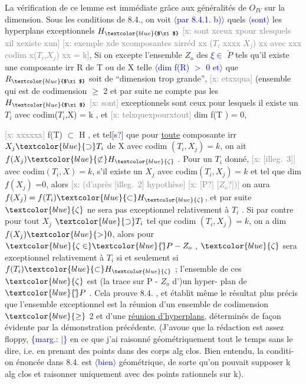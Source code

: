 \documentclass[11pt]{article}
\newcommand{\scanpage}[1]{\par\bigskip\noindent{\small\sffamily[scan #1]}\par}
\newcommand{\mspage}[1]{{\small\sffamily[p.\,#1]}}
\newcommand{\hand}[1]{\textcolor{blue}{#1}}
\let\over\relax
\newcommand{\over}[2]{\textcolor{gray}{#1}\textcolor{blue}{\ensuremath{^{\!\nearrow}}#2}}
\newcommand{\inserted}[2][]{\textcolor{blue}{$\langle$#2$\rangle$}}
\newcommand{\margin}[1]{\textcolor{blue}{\{\textsf{marg.:} #1\}}}
\newcommand{\xout}[1]{\textcolor{gray}{[\textsf{x:} #1]}}
\newcommand{\uline}[1]{\underline{#1}}
\newcommand{\unsure}[1]{[#1?]}
\newcommand{\illegible}[1]{[\textsf{illeg.\ #1}]}
\begin{document}
La vérification de ce lemme est immédiate grâce aux généralités
de $O_{IV}$ sur la dimension. Sous les conditions de 8.4., on voit \inserted[typed]{par 8.4.1. b)} quels \inserted[typed]{sont}
les hyperplans exceptionnels $H_{\hand{$\xi$}}$ \xout{sont xceux xpour xlesquels xil xexiste xun}
\xout{exemple xde xcomposantes xirréd xx ($T_i$ xxxx $X_j$) xx avec xxx codim x($T_i$,$X_j$) xx = k}, Si
on excepte l'ensemble $Z_o$ des \hand{$\xi\in$} $\check{P}$ tels qu'il existe une composante
irr R de T ou de X telle \inserted[typed]{dim f(R) $>$ 0 et} que $R_{\hand{$\xi$}}$ soit de ``dimension trop grande'',
\xout{etxxqua} (ensemble qui est de codimension $\geq$ 2 et par suite ne compte pas
les $H_{\hand{$\xi$}}$ \xout{sont} exceptionnels sont ceux pour lesquels il existe
un $T_i$ avec codim($T_i$,X) = k , et \xout{telxquexpourxtout} dim f(T ) = 0,

\mspage{34}

\clearpage
\scanpage{25/35}
\mspage{\hand{31}}
\xout{xxxxxx} f(T) $\subset$ H , et tel\unsure{\hand{s}} que pour \uline{toute} composante irr $X_j \hand{\supset} T_i$ de X
avec codim $(T_i,X_j)=k$, on ait $f(X_j)\hand{\not\subset} H_{\hand{\zeta}}$ . Pour un $T_i$ donné,
\xout{\illegible{3}} avec codim$(T_i,X)=k$, s'il existe un $X_j$ avec codim$(T_i,X_j)=k$
et tel que dim $f(X_j)$ =0, alors \xout{(d'après \illegible{2} hypothèse}
\xout{\unsure{P} \unsure{$Z_o$})} on aura $f(X_j) = f(T_i) \hand{\subset} H_{\hand{\zeta}}$, et par suite $\hand{\zeta}$ ne
sera pas exceptionnel relativement à $T_i$ . Si par contre pour tout $X_j$
$\hand{\supset} T_i$ tel que codim $(T_i,X_j) = k$, on a dim $f(X_j) \hand{>} 0$, alors pour
$\hand{\zeta \in} \hand{\check{}}P - Z_o$ , $\hand{\zeta}$ sera exceptionnel relativement à $T_i$ si et seulement si
$f(T_i) \hand{\subset} H_{\hand{\zeta}}$ ; l'ensemble de ces $\hand{\zeta}$ est (la trace sur P - $Z_o$\over{)}{\unsure{$\neq$}} d'\hand{)}un hyper-
plan de $\hand{\check{}}P$ . Cela prouve 8.4. , et établit même le résultat plus précis
que l'ensemble exceptionnel est la réunion d'un ensemble de codimension
$\hand{\geq}$ 2 et d'une \uline{réunion d'hyperplans}, déterminés de façon évidente par la
démonstration précédente. (J'avoue que la rédaction est assez floppy, \margin{\hand{|}}
en ce que j'ai raisonné géométriquement tout le temps sans le dire, i.e.
en prenant des points dans des corps alg clos. Bien entendu, la conditi-
on énoncée dans 8.4. est \inserted{bien} géométrique, de sorte qu'on pouvait supposer
k alg clos et raisonner uniquement avec des points rationnels sur k).
\end{document}
